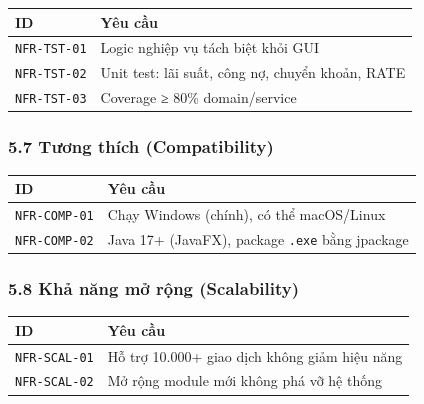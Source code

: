 \documentclass[11pt,a4paper]{article}
\newcounter{none}
\newcommand{\faintline}{\noalign{\global\arrayrulecolor{faintgray}}\hline\noalign{\global\arrayrulecolor{black}}} %
\begin{document}
{\def\LTcaptype{none}
\begin{longtable}[]{@{}
  >{\raggedright\arraybackslash}p{}
  >{\raggedright\arraybackslash}p{}@{}}
\toprule\noalign{}
ID & Yêu cầu \\
\midrule\noalign{}
\endhead
\bottomrule\noalign{}
\endlastfoot
\texttt{NFR-TST-01} & Logic nghiệp vụ tách biệt khỏi GUI \\ \faintline
\texttt{NFR-TST-02} & Unit test: lãi suất, công nợ, chuyển khoản, RATE \\ \faintline
\texttt{NFR-TST-03} & Coverage ≥ 80\% domain/service \\
\end{longtable}
}

\subsubsection{5.7 Tương thích (Compatibility)}\label{tux1b0ux1a1ng-thuxedch-compatibility}

{\def\LTcaptype{none}
\begin{longtable}[]{@{}
  >{\raggedright\arraybackslash}p{}
  >{\raggedright\arraybackslash}p{}@{}}
\toprule\noalign{}
ID & Yêu cầu \\
\midrule\noalign{}
\endhead
\bottomrule\noalign{}
\endlastfoot
\texttt{NFR-COMP-01} & Chạy Windows (chính), có thể macOS/Linux \\ \faintline
\texttt{NFR-COMP-02} & Java 17+ (JavaFX), package \texttt{.exe} bằng jpackage \\
\end{longtable}
}

\subsubsection{5.8 Khả năng mở rộng (Scalability)}\label{khux1ea3-nux103ng-mux1edf-rux1ed9ng-scalability}

{\def\LTcaptype{none}
\begin{longtable}[]{@{}
  >{\raggedright\arraybackslash}p{}
  >{\raggedright\arraybackslash}p{}@{}}
\toprule\noalign{}
ID & Yêu cầu \\
\midrule\noalign{}
\endhead
\bottomrule\noalign{}
\endlastfoot
\texttt{NFR-SCAL-01} & Hỗ trợ 10.000+ giao dịch không giảm hiệu năng \\ \faintline
\texttt{NFR-SCAL-02} & Mở rộng module mới không phá vỡ hệ thống \\
\end{longtable}
}
\end{document}
